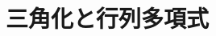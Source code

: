\documentclass[../../topic_linear-algebra]{subfiles}
\begin{document}
\chapter{三角化と行列多項式}\label{ch:triangularization}




\end{document}
